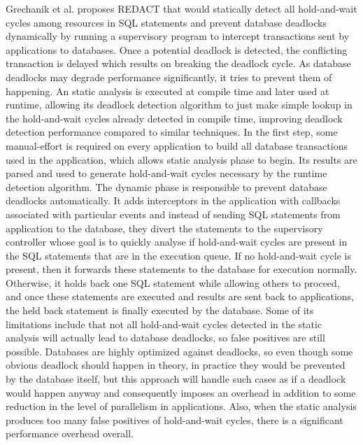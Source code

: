 Grechanik et al. \cite{grechanik} proposes REDACT that would statically detect all hold-and-wait cycles among resources in SQL statements
and prevent database deadlocks dynamically by running a supervisory program to intercept transactions sent by applications to databases.
Once a potential deadlock is detected, the conflicting transaction is delayed which results on breaking the deadlock cycle.
As database deadlocks may degrade performance significantly, it tries to prevent them of happening.
An static analysis is executed at compile time and later used at runtime, allowing its deadlock detection algorithm to just make simple lookup
in the hold-and-wait cycles already detected in compile time, improving deadlock detection performance compared to similar techniques.
In the first step, some manual-effort is required on every application to build all database transactions used in the application,
which allows static analysis phase to begin. Its results are parsed and used to generate hold-and-wait cycles necessary by the runtime detection algorithm.
The dynamic phase is responsible to prevent database deadlocks automatically. It adds interceptors in the application with callbacks associated with particular events and
instead of sending SQL statements from application to the database, they divert the statements to the supervisory controller whose goal is to quickly analyse if
hold-and-wait cycles are present in the SQL statements that are in the execution queue. If no hold-and-wait cycle is present, then it forwards these statements to the
database for execution normally. Otherwise, it holds back one SQL statement while allowing others to proceed,
and once these statements are executed and results are sent back to applications,
the held back statement is finally executed by the database.
Some of its limitations include that not all hold-and-wait cycles detected in the static analysis will actually lead to database deadlocks, so false positives are still possible.
Databases are highly optimized against deadlocks, so even though some obvious deadlock should happen in theory, in practice they would be prevented by the database itself, but
this approach will handle such cases as if a deadlock would happen anyway and consequently imposes an overhead in addition to some reduction in the level of parallelism in applications.
Also, when the static analysis produces too many false positives of hold-and-wait cycles, there is a significant performance overhead overall.


